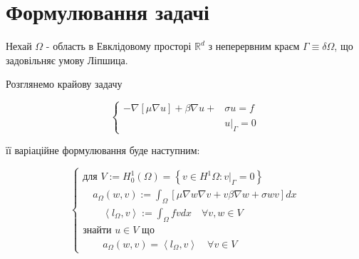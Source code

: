 
\section{Формулювання задачі}

Нехай $\Omega$ - область в Евклідовому просторі $\mathbb{R}^d$ з неперервним краєм $\Gamma \equiv \delta \Omega$, що задовільняє умову Ліпшица.

Розглянемо крайову задачу

\begin{equation}\label{eq:general_boundary}
	\begin{cases}
			- \nabla [\mu \nabla u] + \beta \nabla u + &\sigma u = f  \\
			&u|_\Gamma = 0
	\end{cases}
\end{equation}

її варіаційне формулювання буде наступним:

\begin{equation}\label{eq:general_variational}
	\begin{cases}
		\mbox{для } V := H_0^1 \left( \Omega \right) = 
		\left\lbrace 
			v \in H^1 \Omega : v|_\Gamma = 0
		\right\rbrace \\
		
		\quad a_\Omega(w,v) := \displaystyle\int_\Omega 
		\left[
			\mu \nabla w \nabla v +v \beta \nabla w + \sigma wv
		\right] dx \\
		
		\qquad \left\langle l_\Omega, v \right\rangle := \displaystyle\int_\Omega fvdx \quad \forall v,w \in V \\
		
		\mbox{знайти }u \in V \mbox{ що} \\
		
		\qquad a_\Omega(w,v) = \left\langle l_\Omega, v \right\rangle \quad \forall v \in V
		
	\end{cases}
\end{equation}
